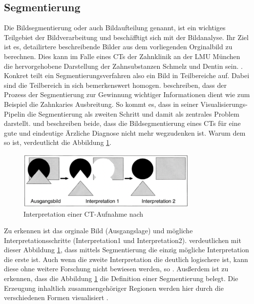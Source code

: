 \subsection{Segmentierung}
\label{subsec:segmentierung} Die Bildsegmentierung oder auch Bildaufteilung genannt,
ist ein wichtiges Teilgebiet der Bildverarbeitung und beschäfftigt sich mit der
Bildanalyse. Ihr Ziel ist es, detailirtere beschreibende Bilder aus dem
vorliegenden Orginalbild zu berechnen. Dies kann im Falle eines CTs der Zahnklinik
an der LMU München die hervorgehobene Darstellung der Zahnsubstanzen Schmelz und
Dentin sein. \citep[vgl.][Seite 359]{lehmann2013bildverarbeitung}. Konkret teilt
ein Segmentierungsverfahren also ein Bild in Teilbereiche auf. Dabei sind die
Teilbereich in sich bemerkenswert homogen. \citet[Seite 1]{ramesh2021} beschreiben,
dass der Prozess der Segmentierung zur Gewinnung wichtiger Informationen dient
wie zum Beispiel die Zahnkaries Ausbreitung. So kommt es, dass \citet[Seite 50]{handels2000}
in seiner Visualisierungs-Pipelin die Segmentierung als zweiten Schritt und
damit als zentrales Problem darstellt. \citet[Seite 95]{handels2000} und \citet[Seite
360]{lehmann2013bildverarbeitung} beschreiben beide, dass die Bildsegmentierung
eines CTs für eine gute und eindeutige Ärzliche Diagnose nicht mehr wegzudenken
ist. Warum dem so ist, verdeutlicht die Abbildung
\ref{fig:interpretation_einer_ct_aufnahem}.

\begin{figure}[h]
	\centering
	\includegraphics[width=0.8\textwidth]{img/bild_interpretation.jpg}
	\caption{Interpretation einer CT-Aufnahme nach \citet[Seite 360]{lehmann2013bildverarbeitung}}
	\label{fig:interpretation_einer_ct_aufnahem}
\end{figure}

Zu erkennen ist das orginale Bild (Ausgangslage) und mögliche Interpretationsschritte
(Interpretation1 und Interpretation2). \citet[Seite 360]{lehmann2013bildverarbeitung}
verdeutlichen mit dieser Abbildung \ref{fig:interpretation_einer_ct_aufnahem}, dass
mittels Segmentierung die einzig mögliche Interpretation die erste ist. Auch
wenn die zweite Interpretation die deutlich logischere ist, kann diese ohne weitere
Forschung nicht bewiesen werden, so \citet[Seite 360]{lehmann2013bildverarbeitung}.
Ausßerdem ist zu erkennen, dass die Abbildung
\ref{fig:interpretation_einer_ct_aufnahem} die Definition einer Segmentierung
belegt. Die Erzeugung inhaltlich zusammengehöriger Regionen werden hier durch die
verschiedenen Formen visualisiert \citep[vgl.][Seite 360]{lehmann2013bildverarbeitung}.

